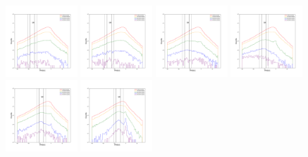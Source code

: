\documentclass[12pt,prd]{article}
\begin{document}
\begin{figure}[h!]
\includegraphics[width=0.24\textwidth]{../figures/scanning_plotsgaiascan_l22_5_b74_4_ra209_6_dec23_3_npy_4.pdf}
\includegraphics[width=0.24\textwidth]{../figures/scanning_plotsgaiascan_l22_5_b74_4_ra209_6_dec23_3_npy_5.pdf}
\includegraphics[width=0.24\textwidth]{../figures/scanning_plotsgaiascan_l22_5_b74_4_ra209_6_dec23_3_npy_6.pdf}
\includegraphics[width=0.24\textwidth]{../figures/scanning_plotsgaiascan_l22_5_b74_4_ra209_6_dec23_3_npy_7.pdf}
\includegraphics[width=0.24\textwidth]{../figures/scanning_plotsgaiascan_l22_5_b74_4_ra209_6_dec23_3_npy_8.pdf}
\includegraphics[width=0.24\textwidth]{../figures/scanning_plotsgaiascan_l22_5_b74_4_ra209_6_dec23_3_npy_9.pdf}

\end{figure}
\end{document}
